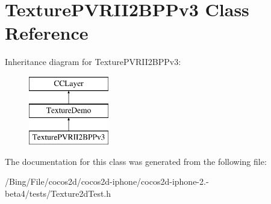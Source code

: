 \hypertarget{interface_texture_p_v_r_i_i2_b_p_pv3}{\section{Texture\-P\-V\-R\-I\-I2\-B\-P\-Pv3 Class Reference}
\label{interface_texture_p_v_r_i_i2_b_p_pv3}
}
Inheritance diagram for Texture\-P\-V\-R\-I\-I2\-B\-P\-Pv3\-:\begin{figure}[H]
\begin{center}
\leavevmode
\includegraphics[height=3.000000cm]{interface_texture_p_v_r_i_i2_b_p_pv3}
\end{center}
\end{figure}


The documentation for this class was generated from the following file\-:\begin{DoxyCompactItemize}
\item 
/\-Bing/\-File/cocos2d/cocos2d-\/iphone/cocos2d-\/iphone-\/2.-\/beta4/tests/Texture2d\-Test.\-h\end{DoxyCompactItemize}

